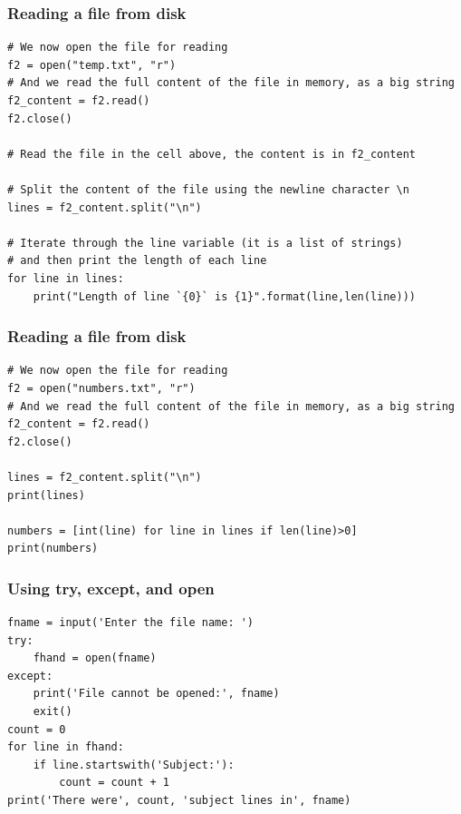 \begin{frame}[fragile]\frametitle{Reading a file from disk}
\begin{lstlisting}
# We now open the file for reading
f2 = open("temp.txt", "r")
# And we read the full content of the file in memory, as a big string
f2_content = f2.read()
f2.close()

# Read the file in the cell above, the content is in f2_content

# Split the content of the file using the newline character \n
lines = f2_content.split("\n")

# Iterate through the line variable (it is a list of strings)
# and then print the length of each line
for line in lines:
    print("Length of line `{0}` is {1}".format(line,len(line)))
\end{lstlisting}
\end{frame}

\begin{frame}[fragile]\frametitle{Reading a file from disk}
\begin{lstlisting}
# We now open the file for reading
f2 = open("numbers.txt", "r")
# And we read the full content of the file in memory, as a big string
f2_content = f2.read()
f2.close()

lines = f2_content.split("\n")
print(lines)

numbers = [int(line) for line in lines if len(line)>0]
print(numbers)
\end{lstlisting}
\end{frame}

\begin{frame}[fragile]\frametitle{Using try, except, and open}
\begin{lstlisting}
fname = input('Enter the file name: ')
try:
	fhand = open(fname)
except:
	print('File cannot be opened:', fname)
	exit()
count = 0
for line in fhand:
	if line.startswith('Subject:'):
		count = count + 1
print('There were', count, 'subject lines in', fname)
\end{lstlisting}
\end{frame}

